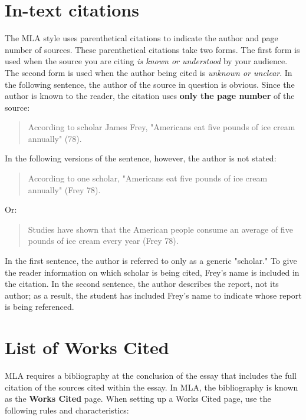 \newpage

\section{In-text citations}
The MLA style uses parenthetical citations to indicate the author and page number of sources. These parenthetical citations take two forms. The first form is used when the source you are citing \emph{is known or understood} by your audience. The second form is used when the author being cited is \emph{unknown or unclear}. In the following sentence, the author of the source in question is obvious. Since the author is known to the reader, the citation uses \textbf{only the page number} of the source: 

\begin{quote}
According to scholar James Frey, "Americans eat five pounds of ice cream 
annually" (78).
\end{quote}

\noindent In the following versions of the sentence, however, the author is not stated:

\begin{quote}
According to one scholar, "Americans eat five pounds of ice cream annually" (Frey 78).
\end{quote}

\noindent Or:
\begin{quote}
Studies have shown that the American people consume an average of five pounds of ice 
cream every year (Frey 78).
\end{quote}

\noindent In the first sentence, the author is referred to only as a generic "scholar." To give the reader information on which scholar is being cited, Frey's name is included in the citation. In the second sentence, the author describes the report, not its author; as a result, the student has included Frey's name to indicate whose report is being referenced. 


\section{List of Works Cited}

MLA requires a bibliography at the conclusion of the essay that includes the full 
citation of the sources cited within the essay. In MLA, the bibliography is known as the 
\textbf{Works Cited} page. When setting up a Works Cited page, use the following rules and 
characteristics:

